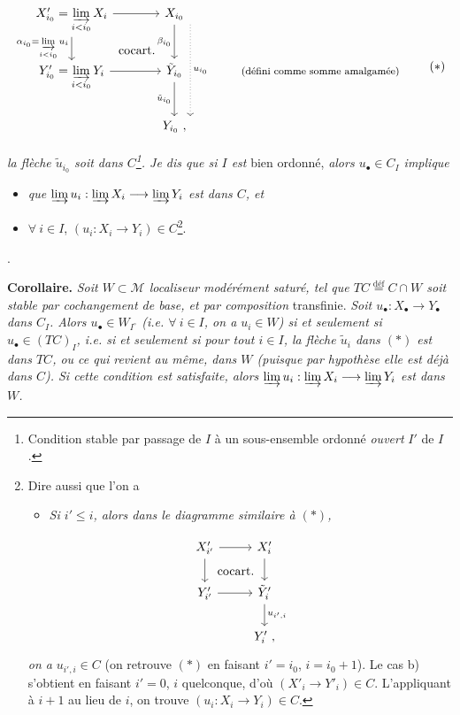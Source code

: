 \documentclass[11pt]{article}
\newcommand{\printedpage}[1]{\marginpar{\footnotesize p.~#1\ifstrequal{#1}{1}{\\[2pt]{[page 1]}}{}}}
\newcommand{\msp}[1]{\ifstrequal{#1}{page 1}{}{\marginpar{\footnotesize [#1]}}}
\begin{document}
\[
\begin{tikzcd}[column sep=large]
X'_{i_0} = \varinjlim\limits_{i<i_0} X_i \arrow[r] \arrow[d, "\alpha_{i_0} = \varinjlim\limits_{i<i_0} u_i"'] \arrow[dr, phantom, "\text{cocart.}"] & X_{i_0} \arrow[d, "\beta_{i_0}"'] \arrow[dd, dotted, shift left=3ex, "u_{i_0}"] & \\
Y'_{i_0} = \varinjlim\limits_{i<i_0} Y_i \arrow[r] & \tilde{Y}_{i_0} \arrow[d, "\tilde{u}_{i_0}"'] & \text{\footnotesize (défini comme somme amalgamée)} \\
& Y_{i_0}\ , &
\end{tikzcd}
\tag*{$(*)$}
\]

\textit{la flèche $\tilde{u}_{i_0}$ soit dans $C$\footnote{Condition stable par passage de $I$ à un sous-ensemble ordonné \textit{ouvert} $I'$ de $I$.}. Je dis que si $I$ est} bien ordonné, \textit{alors $u_\bullet \in C_I$ implique}
\begin{itemize}[leftmargin=2.5em]
\item[a)] \textit{que $\varinjlim u_i : \varinjlim X_i \longrightarrow \varinjlim Y_i$ est dans $C$, et}
\item[b)] $\forall\ i \in I$, $(u_i : X_i \longrightarrow Y_i) \in C$\footnote{Dire aussi que l'on a
\begin{itemize}[leftmargin=2em]
\item[b$'$)] \textit{Si $i' \leq i$, alors dans le diagramme similaire à $(*)$,}
\end{itemize}
\[
\begin{tikzcd}[ampersand replacement=\&]
X'_{i'} \arrow[r] \arrow[d] \arrow[dr, phantom, "\text{cocart.}"] \& X'_i \arrow[d] \\
Y'_{i'} \arrow[r] \& \tilde{Y}'_i \arrow[d, "u_{i',i}"] \\
\& Y'_i\ ,
\end{tikzcd}
\]
\textit{on a} $u_{i',i} \in C$ (on retrouve $(*)$ en faisant $i' = i_0$, $i = i_0 + 1$). Le cas b) s'obtient en faisant $i' = 0$, $i$ quelconque, d'où $(X'_i \longrightarrow Y'_i) \in C$. L'appliquant à $i+1$ au lieu de $i$, on trouve $(u_i : X_i \longrightarrow Y_i) \in C$.}.
\end{itemize}

. %

\textbf{Corollaire.} \textit{Soit $W \subset \mathcal{M}$ localiseur modérément saturé, tel que $TC \overset{\text{déf}}{=} C \cap W$ soit stable par cochangement de base, et par composition} transfinie. \textit{Soit $u_\bullet : X_\bullet \longrightarrow Y_\bullet$ dans $C_I$. Alors $u_\bullet \in W_{I^{\circ}}$ (i.e. $\forall\ i \in I$, on a $u_i \in W$) si et seulement si $u_\bullet \in (TC)_I$, i.e. si et seulement si pour tout $i \in I$, la flèche $\tilde{u}_i$ dans $(*)$ est dans $TC$, ou ce qui}
\msp{page 2: none}
\printedpage{2}
\msp{page 3}
\textit{revient au même, dans $W$ (puisque par hypothèse elle est déjà dans $C$). Si cette condition est satisfaite, alors $\varinjlim u_i : \varinjlim X_i \longrightarrow \varinjlim Y_i$ est dans $W$.}
\end{document}
